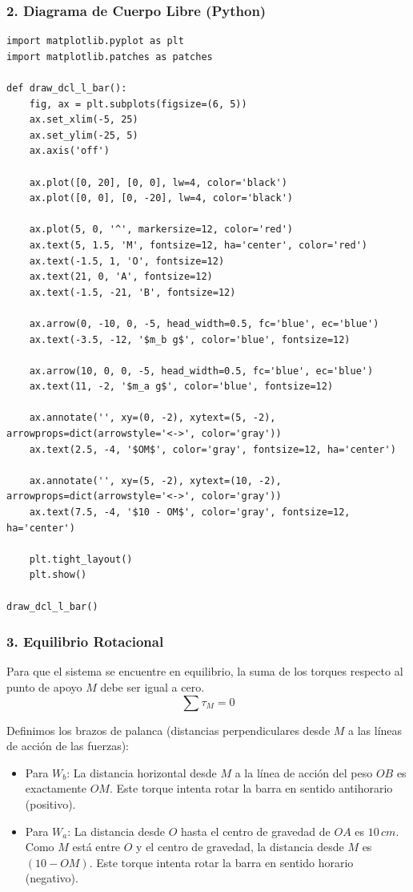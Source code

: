 \documentclass[12pt, a4paper]{article}
\begin{document}
\subsubsection*{2. Diagrama de Cuerpo Libre (Python)}

\begin{lstlisting}
import matplotlib.pyplot as plt
import matplotlib.patches as patches

def draw_dcl_l_bar():
    fig, ax = plt.subplots(figsize=(6, 5))
    ax.set_xlim(-5, 25)
    ax.set_ylim(-25, 5)
    ax.axis('off')
    
    ax.plot([0, 20], [0, 0], lw=4, color='black')
    ax.plot([0, 0], [0, -20], lw=4, color='black')
    
    ax.plot(5, 0, '^', markersize=12, color='red')
    ax.text(5, 1.5, 'M', fontsize=12, ha='center', color='red')
    ax.text(-1.5, 1, 'O', fontsize=12)
    ax.text(21, 0, 'A', fontsize=12)
    ax.text(-1.5, -21, 'B', fontsize=12)
    
    ax.arrow(0, -10, 0, -5, head_width=0.5, fc='blue', ec='blue')
    ax.text(-3.5, -12, '$m_b g$', color='blue', fontsize=12)
    
    ax.arrow(10, 0, 0, -5, head_width=0.5, fc='blue', ec='blue')
    ax.text(11, -2, '$m_a g$', color='blue', fontsize=12)
    
    ax.annotate('', xy=(0, -2), xytext=(5, -2), arrowprops=dict(arrowstyle='<->', color='gray'))
    ax.text(2.5, -4, '$OM$', color='gray', fontsize=12, ha='center')
    
    ax.annotate('', xy=(5, -2), xytext=(10, -2), arrowprops=dict(arrowstyle='<->', color='gray'))
    ax.text(7.5, -4, '$10 - OM$', color='gray', fontsize=12, ha='center')

    plt.tight_layout()
    plt.show()

draw_dcl_l_bar()
\end{lstlisting}

\subsubsection*{3. Equilibrio Rotacional}
Para que el sistema se encuentre en equilibrio, la suma de los torques respecto al punto de apoyo $M$ debe ser igual a cero.
$$\sum \tau_M = 0$$

Definimos los brazos de palanca (distancias perpendiculares desde $M$ a las líneas de acción de las fuerzas):
\begin{itemize}
    \item Para $W_b$: La distancia horizontal desde $M$ a la línea de acción del peso $OB$ es exactamente $OM$. Este torque intenta rotar la barra en sentido antihorario (positivo).
    \item Para $W_a$: La distancia desde $O$ hasta el centro de gravedad de $OA$ es $10 \, \si{cm}$. Como $M$ está entre $O$ y el centro de gravedad, la distancia desde $M$ es $(10 - OM)$. Este torque intenta rotar la barra en sentido horario (negativo).
\end{itemize}
\end{document}
